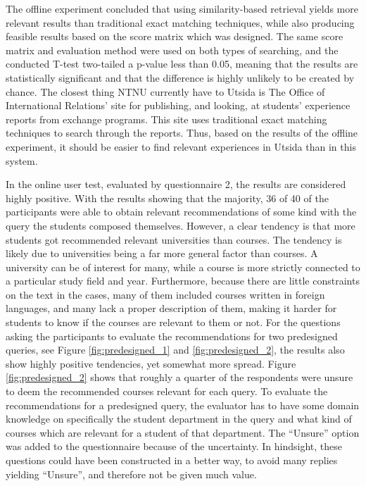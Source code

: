 The offline experiment concluded that using similarity-based retrieval yields more relevant results than traditional exact matching techniques, while also producing feasible results based on the score matrix which was designed. The same score matrix and evaluation method were used on both types of searching, and the conducted T-test two-tailed a p-value less than 0.05, meaning that the results are statistically significant and that the difference is highly unlikely to be created by chance. The closest thing NTNU currently have to Utsida is The Office of International Relations' site for publishing, and looking, at students' experience reports from exchange programs. This site uses traditional exact matching techniques to search through the reports. Thus, based on the results of the offline experiment, it should be easier to find relevant experiences in Utsida than in this system. 

In the online user test, evaluated by questionnaire 2, the results are considered highly positive. With the results showing that the majority, 36 of 40 of the participants were able to obtain relevant recommendations of some kind with the query the students composed themselves. However, a clear tendency is that more students got recommended relevant universities than courses. The tendency is likely due to universities being a far more general factor than courses. A university can be of interest for many, while a course is more strictly connected to a particular study field and year. Furthermore, because there are little constraints on the text in the cases, many of them included courses written in foreign languages, and many lack a proper description of them, making it harder for students to know if the courses are relevant to them or not. For the questions asking the participants to evaluate the recommendations for two predesigned queries, see Figure \ref{fig:predesigned_1} and \ref{fig:predesigned_2}, the results also show highly positive tendencies, yet somewhat more spread. Figure \ref{fig:predesigned_2} shows that roughly a quarter of the respondents were unsure to deem the recommended courses relevant for each query. To evaluate the recommendations for a predesigned query, the evaluator has to have some domain knowledge on specifically the student department in the query and what kind of courses which are relevant for a student of that department. The \enquote{Unsure} option was added to the questionnaire because of the uncertainty. In hindsight, these questions could have been constructed in a better way, to avoid many replies yielding \enquote{Unsure}, and therefore not be given much value. 

